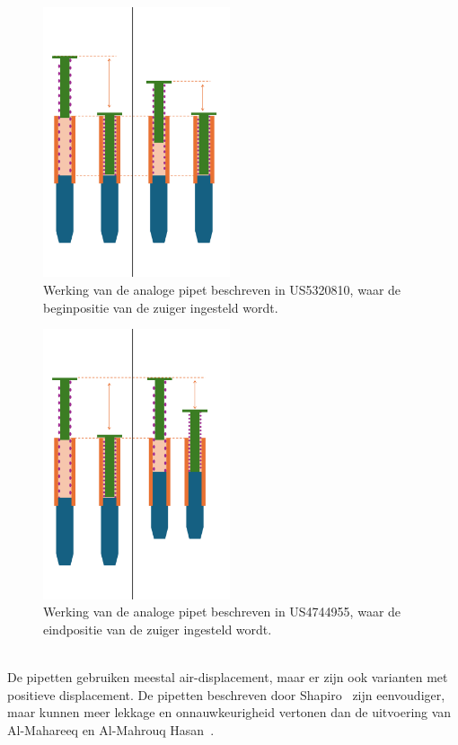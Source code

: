 \begin{minipage}[t]{0.49\textwidth}
    \vspace{0pt}
    \begin{figure}[H]
        \centering
        \captionsetup{width=0.85\textwidth}
        \includegraphics[width=0.49\textwidth]{figures/Werking US5320810.png}
        \caption{Werking van de analoge pipet beschreven in US5320810, waar de beginpositie van de zuiger ingesteld wordt.}\label{fig:werking US5320810}
    \end{figure}
\end{minipage}
\begin{minipage}[t]{0.49\textwidth}
    \vspace{0pt}
    \begin{figure}[H]
        \centering
        \captionsetup{width=0.85\textwidth}
        \includegraphics[width=0.49\textwidth]{figures/Werking US4744955.png}
        \caption{Werking van de analoge pipet beschreven in US4744955, waar de eindpositie van de zuiger ingesteld wordt.}\label{fig:werking US4744955}
    \end{figure}
\end{minipage}
\\[12pt]De pipetten gebruiken meestal air-displacement, maar er zijn ook varianten met positieve displacement. De pipetten beschreven door Shapiro\ \cite{RN16} zijn eenvoudiger, maar kunnen meer lekkage en onnauwkeurigheid vertonen dan de uitvoering van Al-Mahareeq en Al-Mahrouq Hasan\ \cite{RN17}.

